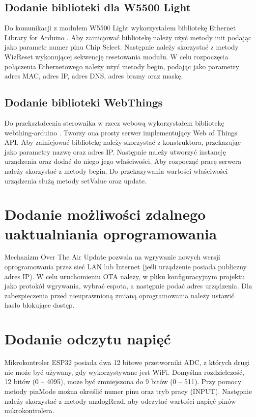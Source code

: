 \documentclass[11pt]{report}
\begin{document}
 \subsection{Dodanie biblioteki dla W5500 Light}
 Do komunikacji z modułem W5500 Light wykorzystałem bibliotekę Ethernet Library for Arduino \cite{ethernetlibrary}. Aby zainicjować bibliotekę należy użyć metody init podając jako parametr numer pinu Chip Select. Następnie należy skorzystać z metody WizReset wykonującej sekwencję resetowania modułu. W celu rozpoczęcia połączenia Ethernetowego należy użyć metody begin, podając jako parametry adres MAC, adres IP, adres DNS, adres bramy oraz maskę.
 \subsection{Dodanie biblioteki WebThings}
 Do przekształcenia sterownika w rzecz webową wykorzystałem bibliotekę webthing-arduino \cite{webthinglibrary}. Tworzy ona prosty serwer implementujący Web of Things API.
 Aby zainicjować bibliotekę należy skorzystać z konstruktora, przekazując jako parametry nazwę oraz adres IP. Następnie należy utworzyć instancję urządzenia oraz dodać do niego jego właściwości. Aby rozpocząć pracę serwera należy skorzystać z metody begin. Do przekazywania wartości właściwości urządzenia służą metody setValue oraz update.
 
 \section{Dodanie możliwości zdalnego uaktualniania oprogramowania}
 Mechanizm Over The Air Update pozwala na wgrywanie nowych wersji oprogramowania przez sieć LAN lub Internet (jeśli urządzenie posiada publiczny adres IP). W celu uruchomieniu OTA należy, w pliku konfiguracyjnym projektu jako protokół wgrywania, wybrać espota, a następnie podać adres urządzenia. Dla zabezpieczenia przed nieuprawnioną zmianą oprogramowania należy ustawić hasło blokujące dostęp.
 
 \section{Dodanie odczytu napięć}
 Mikrokontroler ESP32 posiada dwa 12 bitowe przetworniki ADC, z których drugi nie może być używany, gdy wykorzystywane jest WiFi. Domyślna rozdzielczość, 12 bitów (0 – 4095), może być zmniejszona do 9 bitów (0 – 511).
 Przy pomocy metody pinMode można określić numer pinu oraz tryb pracy (INPUT). Następnie należy skorzystać z metody analogRead, aby odczytać wartości napięć pinów mikrokontrolera.
 
\end{document}
